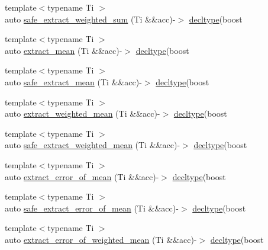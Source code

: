 \begin{DoxyCompactItemize}
\item 
{\footnotesize template$<$typename Ti $>$ }\\auto \hyperlink{namespaceIceBRG_a8fb04c164a11ad99c88668fe4e27c408}{safe\-\_\-extract\-\_\-weighted\-\_\-sum} (Ti \&\&acc)-\/$>$ \hyperlink{namespaceIceBRG_a528e5024ecab03049320529180ae84a8}{decltype}(boost
\item 
{\footnotesize template$<$typename Ti $>$ }\\auto \hyperlink{namespaceIceBRG_aaa0580f7f35a8131cd3e8c7d82dcf274}{extract\-\_\-mean} (Ti \&\&acc)-\/$>$ \hyperlink{namespaceIceBRG_a528e5024ecab03049320529180ae84a8}{decltype}(boost
\item 
{\footnotesize template$<$typename Ti $>$ }\\auto \hyperlink{namespaceIceBRG_ab7c64c9077feb235899d2b5b4e430dbf}{safe\-\_\-extract\-\_\-mean} (Ti \&\&acc)-\/$>$ \hyperlink{namespaceIceBRG_a528e5024ecab03049320529180ae84a8}{decltype}(boost
\item 
{\footnotesize template$<$typename Ti $>$ }\\auto \hyperlink{namespaceIceBRG_ad31aa8d343c477ef399117080a6ff3db}{extract\-\_\-weighted\-\_\-mean} (Ti \&\&acc)-\/$>$ \hyperlink{namespaceIceBRG_a528e5024ecab03049320529180ae84a8}{decltype}(boost
\item 
{\footnotesize template$<$typename Ti $>$ }\\auto \hyperlink{namespaceIceBRG_aad822d817decaa31a0c04ea2ce23a299}{safe\-\_\-extract\-\_\-weighted\-\_\-mean} (Ti \&\&acc)-\/$>$ \hyperlink{namespaceIceBRG_a528e5024ecab03049320529180ae84a8}{decltype}(boost
\item 
{\footnotesize template$<$typename Ti $>$ }\\auto \hyperlink{namespaceIceBRG_ac09602295f7f1efa9c7ec0bccf7ab76e}{extract\-\_\-error\-\_\-of\-\_\-mean} (Ti \&\&acc)-\/$>$ \hyperlink{namespaceIceBRG_a528e5024ecab03049320529180ae84a8}{decltype}(boost
\item 
{\footnotesize template$<$typename Ti $>$ }\\auto \hyperlink{namespaceIceBRG_abd76e84a2b8837b34c2cf6be25c99feb}{safe\-\_\-extract\-\_\-error\-\_\-of\-\_\-mean} (Ti \&\&acc)-\/$>$ \hyperlink{namespaceIceBRG_a528e5024ecab03049320529180ae84a8}{decltype}(boost
\item 
{\footnotesize template$<$typename Ti $>$ }\\auto \hyperlink{namespaceIceBRG_a132e4a423c9a10fb9effb7def6b57143}{extract\-\_\-error\-\_\-of\-\_\-weighted\-\_\-mean} (Ti \&\&acc)-\/$>$ \hyperlink{namespaceIceBRG_a528e5024ecab03049320529180ae84a8}{decltype}(boost

\end{DoxyCompactItemize}
